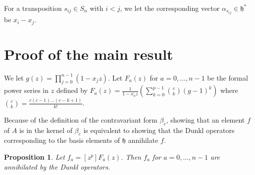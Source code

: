 \documentclass{article}
\numberwithin{equation}{section}
\newtheorem{proposition}[equation]{Proposition}
\newcommand{\h}{\mathfrak{h}}
\begin{document}
For a transposition $s_{ij} \in S_n$ with $i<j$, we let the corresponding vector $\alpha_{s_{ij}} \in \h^*$ be $x_i-x_j$.



\section{Proof of the main result}



We let $g(z)=\prod_{j=0}^{n-1} (1-x_jz)$. Let $F_a(z)$ for $a=0,\dots,n-1$ be the formal power series in $z$ defined by $F_a(z)=\frac{1}{1-x_az} \left( \sum_{k=0}^{p-1} \binom{c}{k}(g-1)^k\right)$ where $\binom{c}{k}=\frac{c(c-1)\dots(c-k+1)}{k!}$. 

Because of the definition of the contravariant form $\beta_c$, showing that an element $f$ of $A$ is in the kernel of $\beta_c$ is equivalent to showing that the Dunkl operators corresponding to the basis elements of $\h$ annihilate $f$.

\begin{proposition}\label{prop:ann} Let $f_a=[z^p]F_a(z)$. Then $f_a$ for $a=0,\dots,n-1$ are annihilated by the Dunkl operators. 
\end{proposition}
\end{document}
